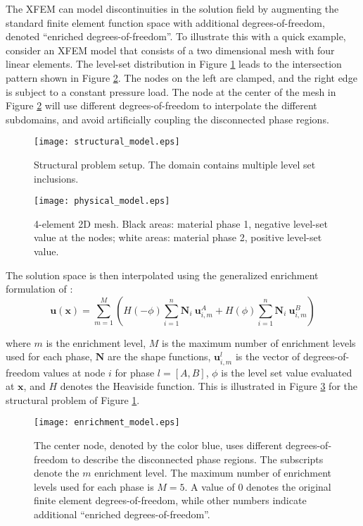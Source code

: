 The XFEM can model discontinuities in the solution field by augmenting the standard finite element function space with additional degrees-of-freedom, denoted ``enriched degrees-of-freedom''. To illustrate this with a quick example, consider an XFEM model that consists of a two dimensional mesh with four linear elements. The level-set distribution in Figure \ref{fig:intro_structural_model} leads to the intersection pattern shown in Figure \ref{fig:intro_physical_model}. The nodes on the left are clamped, and the right edge is subject to a constant pressure load. The node at the center of the mesh in Figure \ref{fig:intro_physical_model} will use different degrees-of-freedom to interpolate the different subdomains, and avoid artificially coupling the disconnected phase regions.
%
\begin{figure}
	\centering
	\texttt{[image: structural\_model.eps]}
	\caption[Structural problem setup.]{Structural problem setup. The domain contains multiple level set inclusions.}
	\label{fig:intro_structural_model}
\end{figure}
%
\begin{figure}
	\centering
	\texttt{[image: physical\_model.eps]}
	\caption[XFEM implementation example physical model]{4-element 2D mesh. Black areas: material phase 1, negative level-set value at the nodes; white areas: material phase 2, positive level-set value.}
	\label{fig:intro_physical_model}
\end{figure}

The solution space is then interpolated using the generalized enrichment formulation of \citep{HH:04}:
%
\begin{equation}
	\mathbf{u}(\mathbf{x}) = \sum \limits^{M}_{m=1} \left( H(-\phi) \sum\limits^{n}_{i=1} \mathbf{N}_i \ \mathbf{u}_{i,m}^A
														 + H( \phi) \sum\limits^{n}_{i=1} \mathbf{N}_i \ \mathbf{u}_{i,m}^B \right)
\end{equation}

where $m$ is the enrichment level, $M$ is the maximum number of enrichment levels used for each phase, $\mathbf{N}$ are the shape functions, $\mathbf{u}^l_{i,m}$ is the vector of degrees-of-freedom values at node $i$ for phase $l=[A,B]$, $\phi$ is the level set value evaluated at $\mathbf{x}$, and $H$ denotes the Heaviside function. This is illustrated in Figure \ref{fig:intro_enrichment_model} for the structural problem of Figure \ref{fig:intro_structural_model}.
%
\begin{figure}[htbp]
	\centering
	\texttt{[image: enrichment\_model.eps]}
	\caption{The center node, denoted by the color blue, uses different degrees-of-freedom to describe the disconnected phase regions. The subscripts denote the $m$ enrichment level. The maximum number of enrichment levels used for each phase is $M=5$. A value of 0 denotes the original finite element degrees-of-freedom, while other numbers indicate additional ``enriched degrees-of-freedom''. }
	\label{fig:intro_enrichment_model}
\end{figure}


